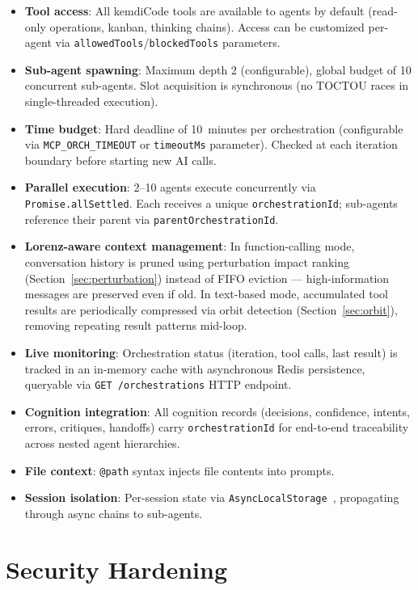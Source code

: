 \documentclass[journal,10pt]{IEEEtran}
\newcommand{\code}[1]{\texttt{#1}}
\begin{document}
\begin{itemize}[nosep]
\item \textbf{Tool access}: All kemdiCode tools are available to agents by default (read-only operations, kanban, thinking chains). Access can be customized per-agent via \code{allowedTools}/\code{blockedTools} parameters.
\item \textbf{Sub-agent spawning}: Maximum depth 2 (configurable), global budget of 10 concurrent sub-agents. Slot acquisition is synchronous (no TOCTOU races in single-threaded execution).
\item \textbf{Time budget}: Hard deadline of 10~minutes per orchestration (configurable via \code{MCP\_ORCH\_TIMEOUT} or \code{timeoutMs} parameter). Checked at each iteration boundary before starting new AI calls.
\item \textbf{Parallel execution}: 2--10 agents execute concurrently via \code{Promise.allSettled}. Each receives a unique \code{orchestrationId}; sub-agents reference their parent via \code{parentOrchestrationId}.
\item \textbf{Lorenz-aware context management}: In function-calling mode, conversation history is pruned using perturbation impact ranking (Section~\ref{sec:perturbation}) instead of FIFO eviction — high-information messages are preserved even if old. In text-based mode, accumulated tool results are periodically compressed via orbit detection (Section~\ref{sec:orbit}), removing repeating result patterns mid-loop.
\item \textbf{Live monitoring}: Orchestration status (iteration, tool calls, last result) is tracked in an in-memory cache with asynchronous Redis persistence, queryable via \code{GET /orchestrations} HTTP endpoint.
\item \textbf{Cognition integration}: All cognition records (decisions, confidence, intents, errors, critiques, handoffs) carry \code{orchestrationId} for end-to-end traceability across nested agent hierarchies.
\item \textbf{File context}: \code{@path} syntax injects file contents into prompts.
\item \textbf{Session isolation}: Per-session state via \code{AsyncLocalStorage}~\cite{nodejs_als}, propagating through async chains to sub-agents.
\end{itemize}

\section{Security Hardening}
\label{sec:security}
\end{document}
